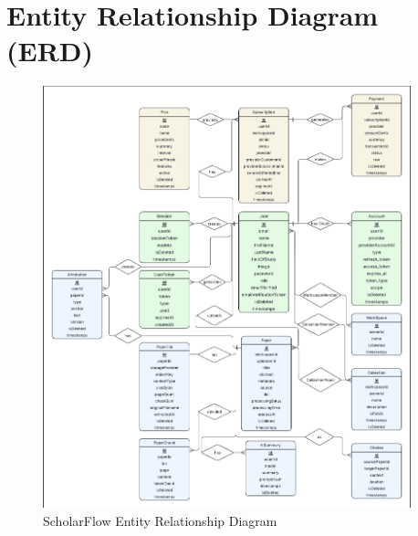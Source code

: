 \chapter{Entity Relationship Diagram (ERD)}
\label{ch:erd}

\begin{figure}[H]
\centering
\includegraphics[width=0.95\textwidth]{images/diagrams/ERD.png}
\caption{ScholarFlow Entity Relationship Diagram}
\label{fig:erd-complete}
\end{figure}

